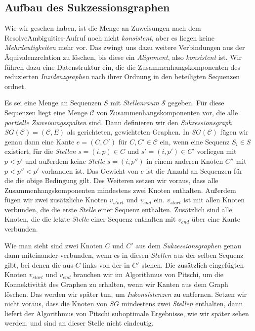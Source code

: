 \subsection{Aufbau des Sukzessionsgraphen}

Wie wir gesehen haben, ist die Menge an Zuweisungen nach dem \textrm{ResolveAmbiguities}-Aufruf noch nicht \emph{konsistent}, aber es liegen keine \emph{Mehrdeutigkeiten} mehr vor. Das zwingt uns dazu weitere Verbindungen aus der Äquivalenzrelation zu löschen, bis diese ein \emph{Alignment}, also \emph{konsistent} ist. Wir führen dazu eine Datenstruktur ein, die die Zusammenhangskomponenten des reduzierten \emph{Inzidenzgraphen} nach ihrer Ordnung in den beteiligten Sequenzen ordnet.

\begin{definition}[Sukzessionsgraph]
	Es sei eine Menge an Sequenzen $S$ mit \emph{Stellenraum} $\mathcal{S}$ gegeben. Für diese Sequenzen liegt eine Menge $\mathcal{C}$ von Zusammenhangskomponenten vor, die alle \emph{partielle Zuweisungsspalten} sind. Dann definieren wir den \emph{Sukzessionsgraph} $SG(\mathcal{C}) = (\mathcal{C},E)$ als gerichteten, gewichteten Graphen. In $SG(\mathcal{C})$ fügen wir genau dann eine Kante $e = (C,C')$ für $C,C' \in \mathcal{C}$ ein, wenn eine Sequenz $S_i \in S$ existiert, für die \emph{Stellen} $s = (i,p) \in C$ und $s' = (i,p') \in C'$ vorliegen mit $p < p'$ und außerdem keine \emph{Stelle} $s = (i,p'')$ in einem anderen Knoten $C''$ mit $p < p'' < p'$ vorhanden ist. Das Gewicht von $e$ ist die Anzahl an Sequenzen für die die obige Bedingung gilt. Des Weiteren setzen wir voraus, dass alle Zusammenhangskomponenten mindestens zwei Knoten enthalten.
	Außerdem fügen wir zwei zusätzliche Knoten $v_{start}$ und $v_{end}$ ein. $v_{start}$ ist mit allen Knoten verbunden, die die erste \emph{Stelle} einer Sequenz enthalten. Zusätzlich sind alle Knoten, die die letzte \emph{Stelle} einer Sequenz enthalten mit $v_{end}$ über eine Kante verbunden.
\end{definition}


Wie man sieht sind zwei Knoten $C$ und $C'$ aus dem \emph{Sukzessionsgraphen} genau dann miteinander verbunden, wenn es in diesen \emph{Stellen} aus der selben Sequenz gibt, bei denen die aus $C$ links von der in $C'$ stehen. Die zusätzlich eingefügten Knoten $v_{start}$ und $v_{end}$ brauchen wir im Algorithmus von Pitschi, um die Konnektivität des Graphen zu erhalten, wenn wir Kanten aus dem Graph löschen. Das werden wir später tun, um \emph{Inkonsistenzen} zu entfernen. Setzen wir nicht voraus, dass die Knoten von $SG$ mindestens zwei \emph{Stellen} enthalten, dann liefert der Algorithmus von Pitschi suboptimale Ergebnisse, wie wir später sehen werden. \cite{cpm10} und \cite{pdc10} sind an dieser Stelle nicht eindeutig. 

